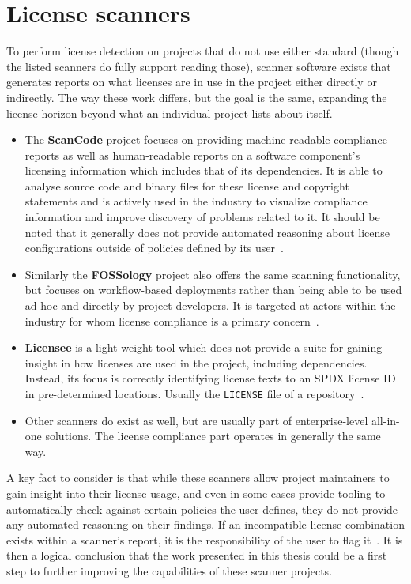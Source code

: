 \section{License scanners}\label{sec:license-scanners}

To perform license detection on projects that do not use either standard (though the listed scanners do fully support reading those), scanner software exists that generates reports on what licenses are in use in the project either directly or indirectly. The way these work differs, but the goal is the same, expanding the license horizon beyond what an individual project lists about itself.

\begin{itemize}
	\item The \textbf{ScanCode} project focuses on providing machine-readable compliance reports as well as human-readable reports on a software component's licensing information which includes that of its dependencies. It is able to analyse source code and binary files for these license and copyright statements and is actively used in the industry to visualize compliance information and improve discovery of problems related to it. It should be noted that it generally does not provide automated reasoning about license configurations outside of policies defined by its user~\cite{scancode-home}.
	
	\item Similarly the \textbf{FOSSology} project also offers the same scanning functionality, but focuses on workflow-based deployments rather than being able to be used ad-hoc and directly by project developers. It is targeted at actors within the industry for whom license compliance is a primary concern~\cite{fossology-home}.
	
	\item \textbf{Licensee} is a light-weight tool which does not provide a suite for gaining insight in how licenses are used in the project, including dependencies. Instead, its focus is correctly identifying license texts to an SPDX license ID in pre-determined locations. Usually the \verb*|LICENSE| file of a repository~\cite{licensee-scanner}.
	
	\item Other scanners do exist as well, but are usually part of enterprise-level all-in-one solutions. The license compliance part operates in generally the same way.
\end{itemize}

A key fact to consider is that while these scanners allow project maintainers to gain insight into their license usage, and even in some cases provide tooling to automatically check against certain policies the user defines, they do not provide any automated reasoning on their findings. If an incompatible license combination exists within a scanner's report, it is the responsibility of the user to flag it~\cite{scancode-home,fossology-home}. It is then a logical conclusion that the work presented in this thesis could be a first step to further improving the capabilities of these scanner projects.

